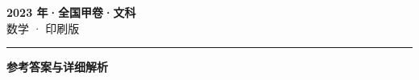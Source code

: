 \documentclass[zihao=5, a4paper]{ctexart}
\begin{document}
\begin{center}
  {\Large\bfseries 2023 年·全国甲卷·文科}\\[4pt]
  {\large 数学 · 印刷版}
\end{center}
\medskip
{}

\par\bigskip\hrule\bigskip
{}
\begin{center}{\large\bfseries 参考答案与详细解析}\end{center}
\smallskip

\end{document}

